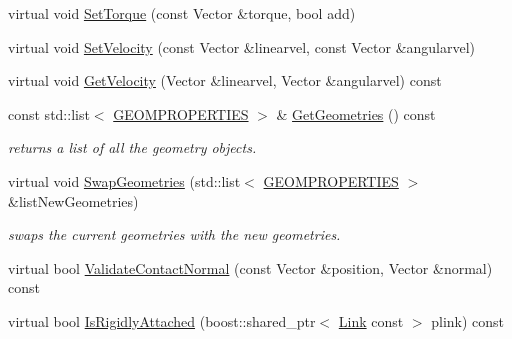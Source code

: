 \begin{DoxyCompactItemize}
\item 
virtual void \hyperlink{classOpenRAVE_1_1KinBody_1_1Link_ac06ccbc6d023627b4032dc3b41beaf93}{SetTorque} (const Vector \&torque, bool add)
\item 
virtual void \hyperlink{classOpenRAVE_1_1KinBody_1_1Link_a259dd9e4a7286a0fe86197b4206166f8}{SetVelocity} (const Vector \&linearvel, const Vector \&angularvel)
\item 
virtual void \hyperlink{classOpenRAVE_1_1KinBody_1_1Link_a9d1d9e28a3922fc0af0bf9e920e71257}{GetVelocity} (Vector \&linearvel, Vector \&angularvel) const 
\item 
\hypertarget{classOpenRAVE_1_1KinBody_1_1Link_a3792744cdcfbc87c686624b9e756b2dd}{
const std::list$<$ \hyperlink{classOpenRAVE_1_1KinBody_1_1Link_1_1GEOMPROPERTIES}{GEOMPROPERTIES} $>$ \& \hyperlink{classOpenRAVE_1_1KinBody_1_1Link_a3792744cdcfbc87c686624b9e756b2dd}{GetGeometries} () const }
\label{classOpenRAVE_1_1KinBody_1_1Link_a3792744cdcfbc87c686624b9e756b2dd}

\begin{DoxyCompactList}\small\item\em returns a list of all the geometry objects. \item\end{DoxyCompactList}\item 
virtual void \hyperlink{classOpenRAVE_1_1KinBody_1_1Link_ad4297527ddd151a0e0a03d86bf16f35e}{SwapGeometries} (std::list$<$ \hyperlink{classOpenRAVE_1_1KinBody_1_1Link_1_1GEOMPROPERTIES}{GEOMPROPERTIES} $>$ \&listNewGeometries)
\begin{DoxyCompactList}\small\item\em swaps the current geometries with the new geometries. \item\end{DoxyCompactList}\item 
virtual bool \hyperlink{classOpenRAVE_1_1KinBody_1_1Link_a80c6877ca0a3b0f5104b00ccfbc7b591}{ValidateContactNormal} (const Vector \&position, Vector \&normal) const 
\item 
\hypertarget{classOpenRAVE_1_1KinBody_1_1Link_a672f12849d49d15030f9386095bf753d}{
virtual bool \hyperlink{classOpenRAVE_1_1KinBody_1_1Link_a672f12849d49d15030f9386095bf753d}{IsRigidlyAttached} (boost::shared\_\-ptr$<$ \hyperlink{classOpenRAVE_1_1KinBody_1_1Link}{Link} const  $>$ plink) const }
\label{classOpenRAVE_1_1KinBody_1_1Link_a672f12849d49d15030f9386095bf753d}


\end{DoxyCompactItemize}
